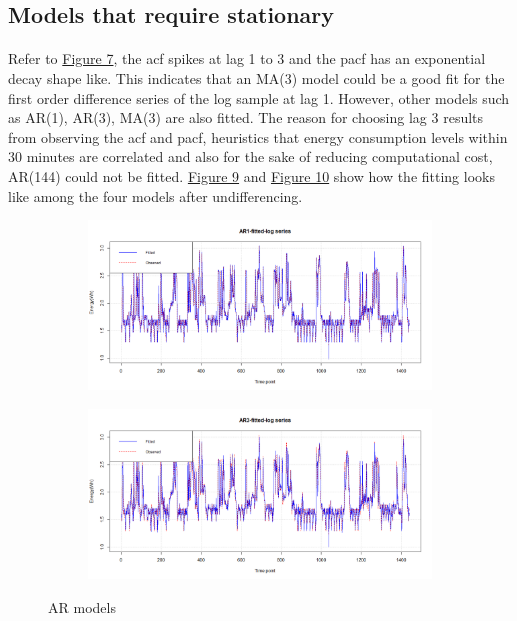 \documentclass[12pt]{article}
\begin{document}
\subsection{Models that require stationary}
\paragraph{}
Refer to \href{figure7}{Figure 7}, the acf spikes at lag 1 to 3 and the pacf has an exponential decay shape like. This indicates that an MA(3) model could be a good fit for the first order difference series of the log sample at lag 1. However, other models such as AR(1), AR(3), MA(3) are also fitted. The reason for choosing lag 3 results from observing the acf and pacf, heuristics that energy consumption levels within 30 minutes are correlated and also for the sake of reducing computational cost, AR(144) could not be fitted. \href{figure9}{Figure 9} and \href{figure10}{Figure 10} show how the fitting looks like among the four models after undifferencing.
\begin{figure}[H]
  \centering
  \begin{subfigure}[b]{0.9\linewidth}
    \includegraphics[width=\linewidth]{figure9-1.png}
  \end{subfigure}
  \begin{subfigure}[b]{0.9\linewidth}
    \includegraphics[width=\linewidth]{figure9-2.png}
  \end{subfigure}
  \caption{AR models}
  \label{fig:figure9}
\end{figure}
\end{document}
